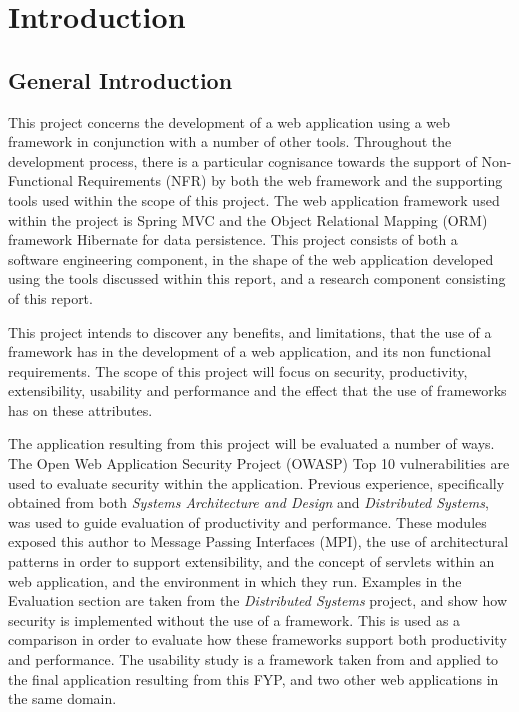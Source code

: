 \chapter{Introduction}
\label{intro}

\section{General Introduction}

This project concerns the development of a web application using a web framework in conjunction with a number of other tools. Throughout the development process, there is a particular cognisance towards the support of Non-Functional Requirements (NFR) by both the web framework and the supporting tools used within the scope of this project. The web application framework used within the project is Spring MVC and the Object Relational Mapping (ORM) framework Hibernate for data persistence. This project consists of both a software engineering component, in the shape of the web application developed using the tools discussed within this report, and a research component consisting of this report.

This project intends to discover any benefits, and limitations, that the use of a framework has in the development of a web application, and its non functional requirements. The scope of this project will focus on security, productivity, extensibility, usability and performance and the effect that the use of frameworks has on these attributes.

The application resulting from this project will be evaluated a number of ways. The Open Web Application Security Project (OWASP) Top 10 vulnerabilities are used to evaluate security within the application. Previous experience, specifically obtained from both \textit{Systems Architecture and Design} and \textit{Distributed Systems}, was used to guide evaluation of productivity and performance. These modules exposed this author to Message Passing Interfaces (MPI), the use of architectural patterns in order to support extensibility, and the concept of servlets within an web application, and the environment in which they run. Examples in the Evaluation section are taken from the \textit{Distributed Systems} project, and show how security is implemented without the use of a framework. This is used as a comparison in order to evaluate how these frameworks support both productivity and performance. The usability study is a framework taken from \parencite{holzinger2005usability} and applied to the final application resulting from this FYP, and two other web applications in the same domain. 

